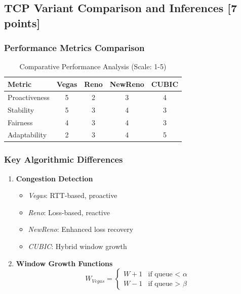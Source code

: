 \documentclass[11pt,a4paper]{article}
\begin{document}
\subsection{TCP Variant Comparison and Inferences [7 points]}
\begin{tcolorbox}[
    enhanced,
    colback=white,
    colframe=red!75!black,
    title=Comparative Analysis of TCP Variants]

\subsubsection{Performance Metrics Comparison}
\begin{table}[h]
\centering
\begin{tabular}{|l|c|c|c|c|}
\hline
\textbf{Metric} & \textbf{Vegas} & \textbf{Reno} & \textbf{NewReno} & \textbf{CUBIC} \\
\hline
Proactiveness & 5 & 2 & 3 & 4 \\
\hline
Stability & 5 & 3 & 4 & 3 \\
\hline
Fairness & 4 & 3 & 4 & 3 \\
\hline
Adaptability & 2 & 3 & 4 & 5 \\
\hline
\end{tabular}
\caption{Comparative Performance Analysis (Scale: 1-5)}
\end{table}

\subsubsection{Key Algorithmic Differences}
\begin{enumerate}
    \item \textbf{Congestion Detection}
    \begin{itemize}
        \item \textit{Vegas}: RTT-based, proactive
        \item \textit{Reno}: Loss-based, reactive
        \item \textit{NewReno}: Enhanced loss recovery
        \item \textit{CUBIC}: Hybrid window growth
    \end{itemize}

    \item \textbf{Window Growth Functions}
    \begin{equation}
        W_{Vegas} = 
        \begin{cases}
            W + 1 & \text{if queue < } \alpha \\
            W - 1 & \text{if queue > } \beta
        \end{cases}
    \end{equation}


\end{enumerate}
\end{tcolorbox}
\end{document}
